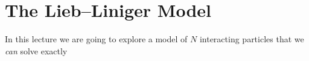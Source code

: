 \section{The Lieb--Liniger Model}

In this lecture we are going to explore a model of $N$ interacting particles that we \emph{can} solve exactly